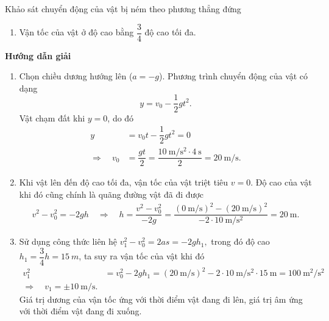 \begin{dang}{Khảo sát chuyển động của vật bị ném theo phương thẳng đứng}
{\begin{enumerate}[label=\alph*.]
			\item Vận tốc của vật ở độ cao bằng $\dfrac{3}{4}$ độ cao tối đa.
		\end{enumerate}
	}
	{	\begin{center}
			\textbf{Hướng dẫn giải}
		\end{center}
		\begin{enumerate}[label=\alph*.]
			\item Chọn chiều dương hướng lên ($a=-g$). Phương trình chuyển động của vật có dạng 
			$$y =v_0 - \dfrac{1}{2}gt^2.$$
			Vật chạm đất khi $y=0$, do đó 
			\begin{align*}
				y&= v_0t -\dfrac{1}{2}gt^2=0\\
				\Rightarrow\quad v_0 &=\dfrac{gt}{2}=\dfrac{
					\SI{10}{\meter/\second^2}\cdot
					\SI{4}{\second}
				}{2} =\SI{20}{\meter/\second}.
			\end{align*}
			\item Khi vật lên đến độ cao tối đa, vận tốc của vật triệt tiêu $v=0$. Độ cao của vật khi đó cũng chính là quãng đường vật đã đi được 
			\begin{align}
				v^2-v_0^2 =-2gh \quad\Rightarrow\quad h =\dfrac{v^2 -v_0^2}{-2g}=\dfrac{(\SI{0}{\meter/\second})^2-(\SI{20}{\meter/\second})^2}{-2\cdot\SI{10}{\meter/\second^{2}}}=\SI{20}{\meter}.
			\end{align}
			\item Sử dụng công thức liên hệ 
			$v_1^2-v_0^2 =2as=-2gh_1,$ 
			trong đó độ cao $h_1=\dfrac{3}{4}h=\SI{15}{m}$,
			ta suy ra vận tốc của vật khi đó 
			\begin{align*}
				v_1^2&=v_0^2 -2gh_1=(\SI{20}{\meter/\second})^2-2\cdot\SI{10}{\meter/\second^{2}}\cdot\SI{15}{\meter}=\SI{100}{\meter^2/\second^2}\\
				\Rightarrow\quad v_1=\pm \SI{10}{\meter/\second}.
			\end{align*}
			Giá trị dương của vận tốc ứng với thời điểm vật đang đi lên, giá trị âm ứng với thời điểm vật đang đi xuống. 
		\end{enumerate}
	}

\end{dang}

